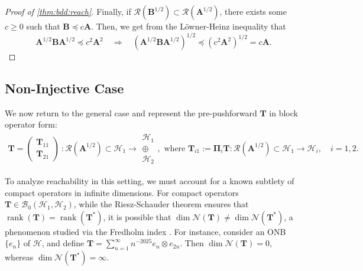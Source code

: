 \documentclass[noinfoline]{imsart}\setcounter{tocdepth}{2}
\newcommand{\m}[1]{\mathbf{#1}} %
\renewcommand{\c}[1]{\mathcal{#1}} %
\DeclareMathOperator*{\rk}{rank}
\theoremstyle{plain}
\begin{document}
\begin{proof}[Proof of \cref{thm:bdd:reach}]
Finally, if $\c{R}(\m{B}^{1/2}) \subset \c{R}(\m{A}^{1/2})$, there exists some $c \ge 0$ such that $\m{B} \preceq c \m{A}$. Then, we get from the L\"{o}wner-Heinz inequality \cite{lowner1934monotone, kato1952notes} that 
\begin{equation*}
    \m{A}^{1/2} \m{B} \m{A}^{1/2} \preceq c^{2} \m{A}^{2} \quad \Longrightarrow \quad (\m{A}^{1/2} \m{B} \m{A}^{1/2})^{1/2} \preceq (c^{2} \m{A}^{2})^{1/2} = c \m{A}.
\end{equation*}
\end{proof}


\subsection{Non-Injective Case}
We now return to the general case and represent the pre-pushforward $\m{T}$ in block operator form:
\begin{align*}
    \m{T} =
    \begin{pmatrix}
    \m{T}_{11} \\
    \m{T}_{21}
    \end{pmatrix}
    \    :
    \c{R}(\m{A}^{1/2}) \subset \c{H}_{1}
    \rightarrow
    \begin{array}{c}
    \c{H}_{1} \\
    \oplus \\
    \c{H}_{2}
    \end{array}, \text{ where }
    \m{T}_{i1} := \m{\Pi}_{i} \m{T}: \c{R}(\m{A}^{1/2}) \subset \c{H}_{1} \to \c{H}_{i}, \quad i = 1, 2.
\end{align*}

To analyze reachability in this setting, we must account for a known subtlety of compact operators in infinite dimensions.
For compact operators $\m{T} \in \c{B}_{0}(\c{H}_{1}, \c{H}_{2})$, while the Riesz-Schauder theorem ensures that $\rk(\m{T}) = \rk(\m{T}^{*})$, it is possible that $\dim \c{N}(\m{T}) \ne \dim \c{N}(\m{T}^{*})$, a phenomenon studied via the Fredholm index \cite{conway2019course}. For instance, consider an ONB $\{e_{n}\}$ of $\c{H}$, and define $\m{T} = \sum_{n=1}^{\infty} n^{-2025} e_{n} \otimes e_{2n}$. Then $\dim \c{N}(\m{T}) = 0$, whereas $\dim \c{N}(\m{T}^{*}) = \infty$. 
\end{document}

